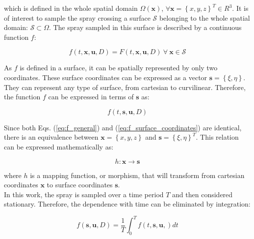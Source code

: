 which is defined in the whole spatial domain $\Omega \left( \boldsymbol{x} \right)$, $\forall \boldsymbol{x} = \left\lbrace x, y, z \right\rbrace^T \in {R}^3$. It is of interest to sample the spray crossing a surface $\mathcal{S}$ belonging to the whole spatial domain: $\mathcal{S} \subset \Omega $. The spray sampled in this surface is described by a continuous function $f$:

\begin{equation}
\label{eq:f_general}
 f \left( t, \textbf{x}, \textbf{u}, D \right) = F \left( t, \textbf{x}, \textbf{u}, D \right) ~ \forall ~ \mathrm{\boldsymbol{x} \in \mathcal{S}} 
\end{equation}

As $f$ is defined in a surface, it can be spatially represented by only two coordinates. These surface coordinates can be expressed as a vector $\boldsymbol{s} = \left\lbrace \xi, \eta \right\rbrace$. They can represent any type of surface, from cartesian to curvilinear. Therefore, the function $f$ can be expressed in terms of $\boldsymbol{s}$ as:

\begin{equation}
\label{eq:f_surface_coordinates}
f \left( t, \boldsymbol{s}, \textbf{u}, D \right)  
\end{equation}

Since both Eqs. (\ref{eq:f_general}) and (\ref{eq:f_surface_coordinates}) are identical, there is an equivalence between $\boldsymbol{x} = \left\lbrace x, y, z \right\rbrace$ and $\boldsymbol{s} = \left\lbrace \xi, \eta \right\rbrace^T$. This relation can be expressed mathematically as:

\begin{equation}
\label{eq:morphism_general_definition}
h : \boldsymbol{x} \rightarrow \boldsymbol{s}
\end{equation}


where $h$ is a mapping function, or morphism, that will transform from cartesian coordinates $\boldsymbol{x}$ to surface coordinates $\boldsymbol{s}$. \\

In this work, the spray is sampled over a time period $T$ and then considered stationary. Therefore, the dependence with time can be eliminated by integration:

\begin{equation}
\label{eq:f_general_time_integrated}
f \left( \boldsymbol{s}, \boldsymbol{u}, D \right) = \frac{1}{T} \int_0^T f \left( t, \boldsymbol{s}, \boldsymbol{u}, \right) dt
\end{equation}

